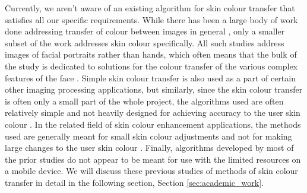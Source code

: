 Currently, we aren't aware of an existing algorithm for skin colour transfer that satisfies all our specific requirements. While there has been a large body of work done addressing transfer of colour between images in general \cite{reinhard_2001_transfer, pitie_2005_pdf, chen_2014_propagation, chang_2015_palette, zhang_2017_decomposition}, only a smaller subset of the work addresses skin colour specifically\cite{yin_2004_transfer, seo_2005_transfer, yang_2017_semantic}. All such studies address images of facial portraits rather than hands, which often means that the bulk of the study is dedicated to solutions for the colour transfer of the various complex features of the face \cite{yang_2017_semantic}. Simple skin colour transfer is also used as a part of certain other imaging processing applications, but similarly, since the skin colour transfer is often only a small part of the whole project, the algorithms used are often relatively simple and not heavily designed for achieving accuracy to the user skin colour \cite{shilkrot_2013_garment, li_2015_replace}. In the related field of skin colour enhancement applications, the methods used are generally meant for small skin colour adjustments and not for making large changes to the user skin colour \cite{aradhye_2009_enhancement, lee_2010_mobile}. Finally, algorithms developed by most of the prior studies do not appear to be meant for use with the limited resources on a mobile device. We will discuss these previous studies of methods of skin colour transfer in detail in the following section, Section \ref{sec:academic_work}.


